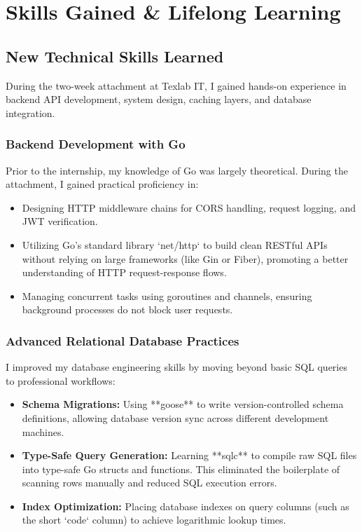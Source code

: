\chapter{Skills Gained \& Lifelong Learning}

\section{New Technical Skills Learned}
During the two-week attachment at Texlab IT, I gained hands-on experience in backend API development, system design, caching layers, and database integration.

\subsection{Backend Development with Go}
Prior to the internship, my knowledge of Go was largely theoretical. During the attachment, I gained practical proficiency in:
\begin{itemize}
    \item Designing HTTP middleware chains for CORS handling, request logging, and JWT verification.
    \item Utilizing Go's standard library `net/http` to build clean RESTful APIs without relying on large frameworks (like Gin or Fiber), promoting a better understanding of HTTP request-response flows.
    \item Managing concurrent tasks using goroutines and channels, ensuring background processes do not block user requests.
\end{itemize}

\subsection{Advanced Relational Database Practices}
I improved my database engineering skills by moving beyond basic SQL queries to professional workflows:
\begin{itemize}
    \item \textbf{Schema Migrations:} Using **goose** to write version-controlled schema definitions, allowing database version sync across different development machines.
    \item \textbf{Type-Safe Query Generation:} Learning **sqlc** to compile raw SQL files into type-safe Go structs and functions. This eliminated the boilerplate of scanning rows manually and reduced SQL execution errors.
    \item \textbf{Index Optimization:} Placing database indexes on query columns (such as the short `code` column) to achieve logarithmic lookup times.
\end{itemize}

